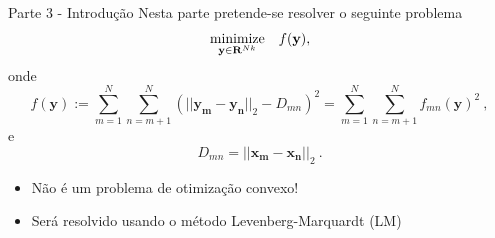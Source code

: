\documentclass{beamer}					%
\begin{document}
\begin{frame}{Parte 3  - Introdução}
Nesta parte pretende-se resolver o seguinte problema
\begin{equation*} \label{eq:problem}
\begin{array}[t]{ll} 
\underset{\mathbf{y} \in \mathbf{R}^{Nk}}{\text{minimize}} & f(\mathbf{y}),\\
\end{array} 
\end{equation*}
onde
\begin{equation*}\label{eq:deff}
f(\mathbf{y}) := \sum_{m=1}^{N}\sum_{n=m+1}^{N}\left(||\mathbf{y_m}-\mathbf{y_n}||_2-D_{mn}\right)^2 = \sum_{m=1}^{N}\sum_{n=m+1}^{N} f_{mn}(\mathbf{y})^2 \:,
\end{equation*} 
e
\begin{equation*}\label{key}
D_{mn} = ||\mathbf{x_m}-\mathbf{x_n}||_2 \:.
\end{equation*}
\begin{itemize}
\item Não é um problema de otimização convexo!
\item Será resolvido usando o método Levenberg-Marquardt (LM)
\end{itemize}
\end{frame}

\end{document}

